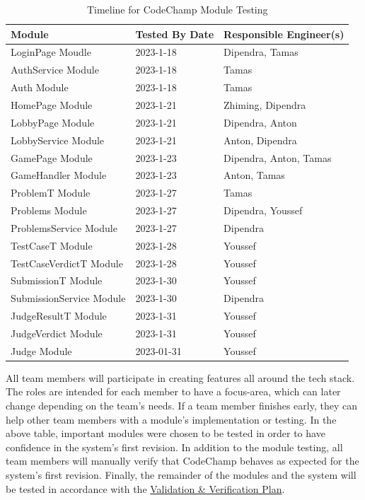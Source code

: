 \documentclass[12pt, titlepage]{article}
\begin{document}
\newpage{}

\begin{table}[H]
\centering
\begin{tabular}{p{} p{}  p{}}
\toprule
Module & Tested By Date & Responsible Engineer(s) \\
\midrule
LoginPage Moudle & 2023-1-18 &  Dipendra, Tamas\\
AuthService Module & 2023-1-18 & Tamas\\
Auth Module & 2023-1-18 & Tamas\\

HomePage Module & 2023-1-21 & Zhiming, Dipendra\\
LobbyPage Module & 2023-1-21 & Dipendra, Anton \\
LobbyService Module & 2023-1-21 & Anton, Dipendra\\

GamePage Module & 2023-1-23 & Dipendra, Anton, Tamas \\
GameHandler Module & 2023-1-23 & Anton, Tamas\\

ProblemT Module & 2023-1-27 & Tamas\\ 
Problems Module & 2023-1-27 & Dipendra, Youssef\\
ProblemsService Module & 2023-1-27 & Dipendra\\

TestCaseT Module & 2023-1-28 & Youssef\\
TestCaseVerdictT Module & 2023-1-28 & Youssef\\

SubmissionT Module & 2023-1-30 & Youssef\\
SubmissionService Module & 2023-1-30 & Dipendra\\

JudgeResultT Module & 2023-1-31 & Youssef\\
JudgeVerdict Module & 2023-1-31 & Youssef\\
Judge Module & 2023-01-31 & Youssef\\
\end{tabular}
\caption{Timeline for CodeChamp Module Testing}
\label{TblMH}
\end{table}

All team members will participate in creating features all around the tech stack. The roles are intended for each member to have a focus-area, which can later change depending on the team's needs. If a team member finishes early, they can help other team members with a module's implementation or testing. In the above table, important modules were chosen to be tested in order to have confidence in the system's first revision. In addition to the module testing, all team members will manually verify that CodeChamp behaves as expected for the system's first revision. Finally, the remainder of the modules and the system will be tested in accordance with the \href{https://github.com/Tamas-Leung/CodeChamp/blob/main/docs/VnVPlan}{Validation \& Verification Plan}.
\end{document}

